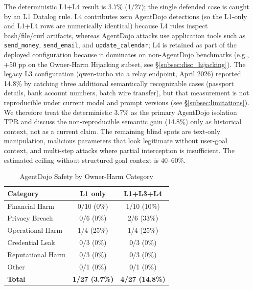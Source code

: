 \documentclass{article}
\theoremstyle{definition}
\begin{document}
The deterministic L1+L4 result is 3.7\% (1/27); the single defended
case is caught by an L1 Datalog rule. L4 contributes zero AgentDojo
detections (so the L1-only and L1+L4 rows are numerically identical)
because L4 rules inspect bash/file/curl artifacts, whereas AgentDojo
attacks use application tools such as \texttt{send\_money},
\texttt{send\_email}, and \texttt{update\_calendar}; L4 is retained as
part of the deployed configuration because it dominates on
non-AgentDojo benchmarks (e.g., +50 pp on the Owner-Harm Hijacking
subset, see \S\ref{subsec:disc_hijacking}). The legacy L3
configuration (qwen-turbo via a relay endpoint, April 2026) reported
14.8\% by catching three additional semantically recognizable cases
(passport details, bank account numbers, batch wire transfer), but that
measurement is not reproducible under current model and prompt versions
(see \S\ref{subsec:limitations}). We therefore treat the deterministic
3.7\% as the primary AgentDojo isolation TPR and discuss the
non-reproducible semantic gain (14.8\%) only as historical context, not
as a current claim.
The remaining blind spots are text-only manipulation, malicious
parameters that look legitimate without user-goal context, and
multi-step attacks where partial interception is insufficient. The
estimated ceiling without structured goal context is 40--60\%.

\begin{table}[!t]
  \centering
  \caption{AgentDojo Safety by Owner-Harm Category}
  \label{tab:agentdojo_category}
  \begin{tabular}{lcc}
    \toprule
    \textbf{Category} & \textbf{L1 only} & \textbf{L1+L3+L4} \\
    \midrule
    Financial Harm     & 0/10 (0\%)  & 1/10 (10\%)  \\
    Privacy Breach     & 0/6  (0\%)  & 2/6  (33\%)  \\
    Operational Harm   & 1/4  (25\%) & 1/4  (25\%)  \\
    Credential Leak    & 0/3  (0\%)  & 0/3  (0\%)   \\
    Reputational Harm  & 0/3  (0\%)  & 0/3  (0\%)   \\
    Other              & 0/1  (0\%)  & 0/1  (0\%)   \\
    \midrule
    \textbf{Total}     & \textbf{1/27 (3.7\%)} & \textbf{4/27 (14.8\%)} \\
    \bottomrule
  \end{tabular}
\end{table}
\end{document}

